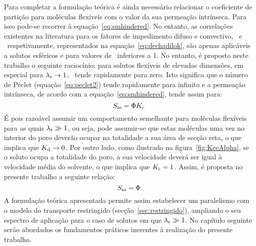 Para completar a formulação teórica é ainda necessário relacionar o coeficiente de partição para moléculas flexíveis com o valor da sua permeação intrínseca. Para isso pode-se recorrer à equação~\ref{eq:smhindered}. No entanto, as correlações existentes na literatura para os fatores de impedimento difuso e convectivo, \kapade\ e \kapace\ respetivamente, representados na equação~\ref{eq:dechadilok}, são apenas aplicáveis a solutos esféricos e para valores de \lambdas\ inferiores a 1. No entanto, é proposto neste trabalho o seguinte raciocínio: para solutos flexíveis de elevadas dimensões, em especial para $\lambda_{\mathrm{s}}\rightarrow 1$, \kapade\ tende rapidamente para zero. Isto significa que o número de Péclet (equação~\ref{eq:peclet2}) tende rapidamente para infinito e a permeação intrínseca, de acordo com a equação~\ref{eq:smhindered}, tende assim para:
\begin{equation}
 	\label{sm_inf}
 	S_{\mathrm{m}} = \Phi K_{\mathrm{c}}
\end{equation} 
É pois razoável assumir um comportamento semelhante para moléculas flexíveis para as quais $\lambda_{\mathrm{s}}\gg 1$, ou seja, pode assumir-se que estas moléculas uma vez no interior do poro deverão ocupar na totalidade a sua área de secção reta, o que implica que $K_{\mathrm{d}}\rightarrow 0$. Por outro lado, como ilustrado na figura~\ref{fig:KceAlpha}, se o soluto ocupa a totalidade do poro, a sua velocidade deverá ser igual à velocidade média do solvente, o que implica que $K_{\mathrm{c}} = 1$. Assim, é proposta no presente trabalho a seguinte relação:
\begin{equation}
	\label{eq:parti_vs_sm}
	S_{\mathrm{m}} = \Phi
\end{equation}%
A formulação teórica apresentada permite assim estabelecer um paralelismo com o modelo do transporte restringido (secção~\ref{sec:restringido}), ampliando o seu espectro de aplicação para o caso de solutos em que $\lambda_{\mathrm{s}} \gg 1$. No capítulo seguinte serão abordados os fundamentos práticos inerentes à realização do presente trabalho.  
